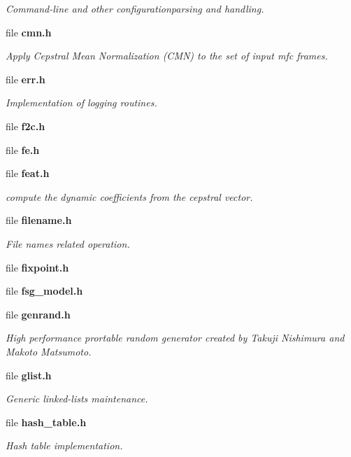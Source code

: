 \begin{DoxyCompactItemize}
\begin{DoxyCompactList}\small\item\em Command-\/line and other configurationparsing and handling. \end{DoxyCompactList}\item 
file {\bf cmn.\-h}
\begin{DoxyCompactList}\small\item\em Apply Cepstral Mean Normalization (C\-M\-N) to the set of input mfc frames. \end{DoxyCompactList}\item 
file {\bf err.\-h}
\begin{DoxyCompactList}\small\item\em Implementation of logging routines. \end{DoxyCompactList}\item 
file {\bfseries f2c.\-h}
\item 
file {\bfseries fe.\-h}
\item 
file {\bf feat.\-h}
\begin{DoxyCompactList}\small\item\em compute the dynamic coefficients from the cepstral vector. \end{DoxyCompactList}\item 
file {\bf filename.\-h}
\begin{DoxyCompactList}\small\item\em File names related operation. \end{DoxyCompactList}\item 
file {\bfseries fixpoint.\-h}
\item 
file {\bfseries fsg\-\_\-model.\-h}
\item 
file {\bf genrand.\-h}
\begin{DoxyCompactList}\small\item\em High performance prortable random generator created by Takuji Nishimura and Makoto Matsumoto. \end{DoxyCompactList}\item 
file {\bf glist.\-h}
\begin{DoxyCompactList}\small\item\em Generic linked-\/lists maintenance. \end{DoxyCompactList}\item 
file {\bf hash\-\_\-table.\-h}
\begin{DoxyCompactList}\small\item\em Hash table implementation. \end{DoxyCompactList}\item 

\end{DoxyCompactItemize}

